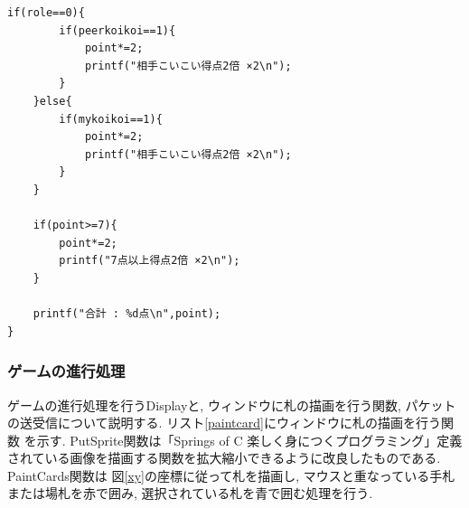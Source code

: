 \documentclass[a4j]{jarticle}
\begin{document}
\begin{lstlisting}[basicstyle=\ttfamily\footnotesize, frame=single,label=yaku,caption=役の処理]
    if(role==0){
        if(peerkoikoi==1){
            point*=2;
            printf("相手こいこい得点2倍 ×2\n");
        }
    }else{
        if(mykoikoi==1){
            point*=2;
            printf("相手こいこい得点2倍 ×2\n");
        }
    }

    if(point>=7){
        point*=2;
        printf("7点以上得点2倍 ×2\n");
    }

    printf("合計 : %d点\n",point);
}
    \end{lstlisting}

    \subsubsection{ゲームの進行処理}
    ゲームの進行処理を行うDisplayと, ウィンドウに札の描画を行う関数, パケットの送受信について説明する. リスト\ref{paintcard}にウィンドウに札の描画を行う関数
    を示す. PutSprite関数は「Springs of C 楽しく身につくプログラミング」\cite{SC}定義されている画像を描画する関数を拡大縮小できるように改良したものである. PaintCards関数は
    図\ref{xy}の座標に従って札を描画し, マウスと重なっている手札または場札を赤で囲み, 選択されている札を青で囲む処理を行う.
\end{document}
